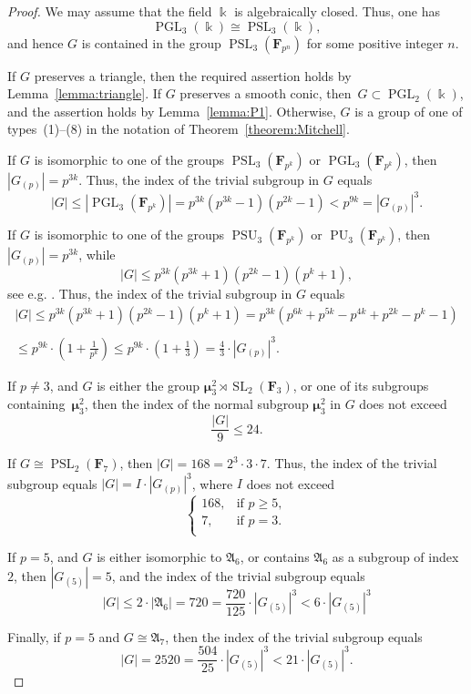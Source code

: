 \documentclass[12pt]{amsart}
\numberwithin{equation}{section}
\theoremstyle{definition}
\newcommand{\mumu}{\boldsymbol{\mu}}
\DeclareMathOperator{\SL}{SL}
\DeclareMathOperator{\PGL}{PGL}
\DeclareMathOperator{\PSL}{PSL}
\DeclareMathOperator{\PU}{PU}
\DeclareMathOperator{\PSU}{PSU}
\def \ge {\geqslant}
\def \le {\leqslant}
\begin{document}
\begin{proof}
We may assume that the field $\Bbbk$ is algebraically closed.
Thus, one has
$$
\PGL_3(\Bbbk)\cong\PSL_3(\Bbbk),
$$
and hence $G$ is contained in
the group $\PSL_3(\mathbf{F}_{p^n})$ for some positive integer $n$.

If $G$ preserves a triangle, then the required assertion holds by Lemma~\ref{lemma:triangle}.
If $G$ preserves a smooth conic, then~\mbox{$G\subset\PGL_2(\Bbbk)$},
and the assertion holds by Lemma~\ref{lemma:P1}.
Otherwise, $G$ is a group of one of
types~\mbox{(1)--(8)} in the notation of Theorem~\ref{theorem:Mitchell}.

If $G$ is isomorphic to one of the groups
$\PSL_3(\mathbf{F}_{p^k})$ or
$\PGL_3(\mathbf{F}_{p^k})$, then~\mbox{$|G_{(p)}|=p^{3k}$}. Thus,
the index of the trivial subgroup in $G$ equals
$$
|G|\le |\PGL_3(\mathbf{F}_{p^k})|=p^{3k}(p^{3k}-1)(p^{2k}-1)<p^{9k}=|G_{(p)}|^3.
$$

If $G$ is isomorphic to one of the groups
$\PSU_3(\mathbf{F}_{p^k})$ or $\PU_3(\mathbf{F}_{p^k})$,
then~\mbox{$|G_{(p)}|=p^{3k}$}, while
$$
|G|\le p^{3k}(p^{3k}+1)(p^{2k}-1)(p^k+1),
$$
see e.g. \cite[\S3.6]{Wilson}. Thus,
the index of the trivial subgroup in $G$ equals
\begin{multline*}
|G|\le p^{3k}(p^{3k}+1)(p^{2k}-1)(p^k+1)=
p^{3k}(p^{6k}+p^{5k}-p^{4k}+p^{2k}-p^k-1)\\
\\ \le p^{9k}\cdot\left(1+\frac{1}{p^k}\right)\le
p^{9k}\cdot\left(1+\frac{1}{3}\right)=\frac{4}{3}\cdot |G_{(p)}|^3.
\end{multline*}

If $p\neq 3$, and $G$ is either the group $\mumu_3^2\rtimes\SL_2(\mathbf{F}_3)$, or one of
its subgroups containing~$\mumu_3^2$, then the index of the normal subgroup $\mumu_3^2$
in $G$ does not exceed
$$
\frac{|G|}{9}\le 24.
$$

If $G\cong\PSL_2(\mathbf{F}_7)$, then $|G|=168=2^3\cdot 3\cdot 7$. Thus, the index of the trivial subgroup
equals
$|G|=I \cdot |G_{(p)}|^3$, where $I$ does not exceed
$$
\begin{cases}
168, &\text{if\ } p\ge 5,\\
7, &\text{if\ } p=3.\\
\end{cases}
$$

If $p=5$, and $G$ is either isomorphic to $\mathfrak{A}_6$,
or contains $\mathfrak{A}_6$ as a subgroup of index $2$, then
$|G_{(5)}|=5$, and
the index of the trivial subgroup equals
$$
|G|\le 2\cdot |\mathfrak{A}_6|=720=\frac{720}{125}\cdot |G_{(5)}|^3<
6\cdot |G_{(5)}|^3
$$

Finally, if $p=5$ and $G\cong\mathfrak{A}_7$, then the index of the trivial subgroup equals
$$
|G|=2520=\frac{504}{25}\cdot |G_{(5)}|^3<21\cdot |G_{(5)}|^3.
$$
\end{proof}
\end{document}
